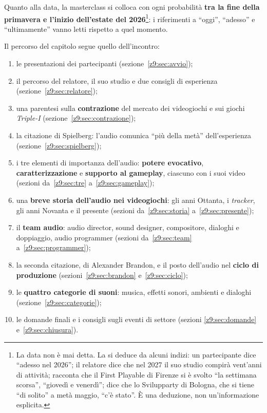 Quanto alla data, la masterclass si colloca con ogni probabilità \textbf{tra la
fine della primavera e l'inizio dell'estate del 2026}\footnote{La data non è mai
detta. La si deduce da alcuni indizi: un partecipante dice ``adesso nel 2026'';
il relatore dice che nel 2027 il suo studio compirà vent'anni di attività;
racconta che il First Playable di Firenze si è svolto ``la settimana scorsa'',
``giovedì e venerdì''; dice che lo Svilupparty di Bologna, che si tiene ``di
solito'' a metà maggio, ``c'è stato''. È una deduzione, non un'informazione
esplicita.}: i riferimenti a ``oggi'', ``adesso'' e ``ultimamente'' vanno letti
rispetto a quel momento.

Il percorso del capitolo segue quello dell'incontro:
\begin{enumerate}
  \item le presentazioni dei partecipanti (sezione~\ref{z9:sec:avvio});
  \item il percorso del relatore, il suo studio e due consigli di esperienza
        (sezione~\ref{z9:sec:relatore});
  \item una parentesi sulla \textbf{contrazione} del mercato dei videogiochi e
        sui giochi \emph{Triple-I} (sezione~\ref{z9:sec:contrazione});
  \item la citazione di Spielberg: l'audio comunica ``più della metà''
        dell'esperienza (sezione~\ref{z9:sec:spielberg});
  \item i tre elementi di importanza dell'audio: \textbf{potere evocativo},
        \textbf{caratterizzazione} e \textbf{supporto al gameplay}, ciascuno
        con i suoi video (sezioni da~\ref{z9:sec:tre} a~\ref{z9:sec:gameplay});
  \item una \textbf{breve storia dell'audio nei videogiochi}: gli anni Ottanta, i
        \emph{tracker}, gli anni Novanta e il presente (sezioni
        da~\ref{z9:sec:storia} a~\ref{z9:sec:presente});
  \item il \textbf{team audio}: audio director, sound designer, compositore,
        dialoghi e doppiaggio, audio programmer (sezioni
        da~\ref{z9:sec:team} a~\ref{z9:sec:programmer});
  \item la seconda citazione, di Alexander Brandon, e il posto dell'audio nel
        \textbf{ciclo di produzione} (sezioni~\ref{z9:sec:brandon}
        e~\ref{z9:sec:ciclo});
  \item le \textbf{quattro categorie di suoni}: musica, effetti sonori, ambienti
        e dialoghi (sezione~\ref{z9:sec:categorie});
  \item le domande finali e i consigli sugli eventi di settore (sezioni
        \ref{z9:sec:domande} e~\ref{z9:sec:chiusura}).
\end{enumerate}

